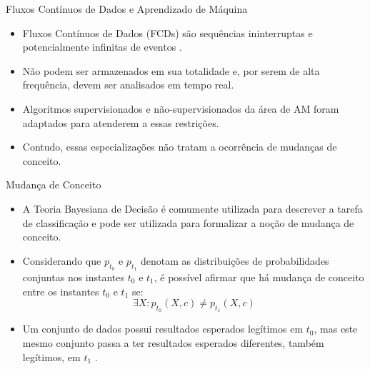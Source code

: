 \documentclass[10pt]{beamer}
\begin{document}
\begin{frame}{Fluxos Contínuos de Dados e Aprendizado de Máquina}
    \begin{itemize}
        \item<1 -> \alert{Fluxos Contínuos de Dados (FCDs)} são sequências ininterruptas e potencialmente infinitas de eventos \cite{Aggarwal:2006:DSM:1196418}.
        \item<2 -> Não podem ser armazenados em sua totalidade e, por serem de alta frequência, devem ser analisados em tempo real.
        \item<3 -> Algoritmos supervisionados \cite{Domingos:2000:MHD:347090.347107, Bifet:2013:EDS:2480362.2480516, Wang:2003:MCD:956750.956778, Aggarwal:2004:DCD:1014052.1014110, Gama:2003:ADT:956750.956813} e não-supervisionados \cite{Aggarwal:2003:FCE:1315451.1315460, Ackermann:2012:SCA:2133803.2184450, Kranen:2011:CIM:2134350.2134352} da área de AM foram adaptados para atenderem a essas restrições.
        \item<4 -> Contudo, essas especializações não tratam a ocorrência de \alert{mudanças de conceito}.
      \end{itemize}
\end{frame}

\begin{frame}{Mudança de Conceito}
    \begin{itemize}
        \item<1 -> A Teoria Bayesiana de Decisão \cite{Duda:2000:PC:954544} é comumente utilizada para descrever a tarefa de classificação e pode ser utilizada para formalizar a noção de \alert{mudança de conceito}.
        \item<2 -> Considerando que $p_{t_0}$ e $p_{t_1}$ denotam as distribuições de probabilidades conjuntas nos instantes $t_0$ e $t_1$, é possível afirmar que há mudança de conceito entre os instantes $t_0$ e $t_1$ se:
        \begin{equation} \label{eq:3}
            {\exists}X : p_{t_0}(X, c) \ne p_{t_1}(X, c)
        \end{equation}
        \item<3 -> Um conjunto de dados possui resultados esperados legítimos em $t_0$, mas este mesmo conjunto passa a ter resultados esperados diferentes, também legítimos, em $t_1$ \cite{Kolter:2007:DWM:1314498.1390333}.
    \end{itemize}
\end{frame}
\end{document}
